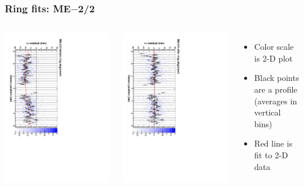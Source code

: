 \documentclass[compress]{beamer}
\begin{document}
\begin{frame}
\frametitle{Ring fits: ME$-$2/2}
\vfill
\begin{columns}
\includegraphics[height=\linewidth, angle=90]{ringfits_before/mem22.pdf}

\includegraphics[height=\linewidth, angle=90]{ringfits_after/mem22.pdf}
\begin{itemize}
\item Color scale is 2-D plot
\item Black points are a profile (averages in vertical bins)
\item Red line is fit to 2-D data
\end{itemize}
\end{columns}
\end{frame}
\end{document}
